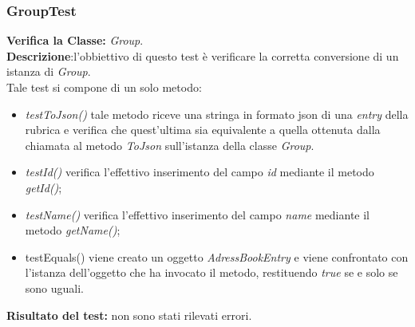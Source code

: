 \subsubsection{GroupTest}
\textbf{Verifica la Classe:} \textit{Group}.\\
\textbf{Descrizione}:l'obbiettivo di questo test è verificare la corretta conversione di un istanza di \textit{Group}.\\
Tale test si compone di un solo metodo:
\begin{itemize}
\item \textit{testToJson() } tale metodo riceve una stringa in formato json di una 	\textit{entry} della rubrica e verifica che quest'ultima sia equivalente a quella ottenuta dalla chiamata al metodo \textit{ToJson} sull'istanza della classe \textit{Group}.
\item \textit{testId() } verifica l'effettivo inserimento del campo \textit{id} mediante il metodo \textit{getId()};
\item \textit{testName() } verifica l'effettivo inserimento del campo \textit{name} mediante il metodo \textit{getName()};
\item{testEquals()} viene creato un oggetto \textit{AdressBookEntry} e viene confrontato con l'istanza dell'oggetto che ha invocato il metodo, restituendo \textit{true} se e solo se sono uguali.
\end{itemize}
\textbf{Risultato del test:} non sono stati rilevati errori.

